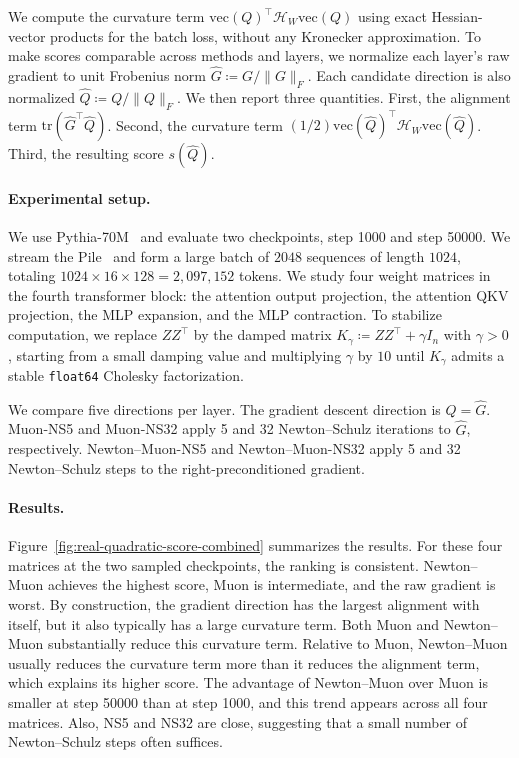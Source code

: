 \documentclass[11pt]{article}
\begin{document}
We compute the curvature term $\mathrm{vec}({Q})^\top {\mathcal{H}}_{{W}} \mathrm{vec}({Q})$ using exact Hessian-vector products for the batch loss, without any Kronecker approximation.
To make scores comparable across methods and layers, we normalize each layer's raw gradient to unit Frobenius norm
$\widehat{{G}} \coloneqq {G} / \|{G}\|_F$.
Each candidate direction is also normalized
$\widehat{{Q}} \coloneqq {Q} / \|{Q}\|_F$.
We then report three quantities. First, the alignment term
$\mathrm{tr}(\widehat{{G}}^\top \widehat{{Q}})$.
Second, the curvature term
$(1/2)\mathrm{vec}(\widehat{{Q}})^\top {\mathcal{H}}_{{W}} \mathrm{vec}(\widehat{{Q}})$.
Third, the resulting score
$s(\widehat{{Q}})$.


\paragraph{Experimental setup.}
We use Pythia-70M~\citep{biderman2023pythia} and evaluate two checkpoints, step 1000 and step 50000. We stream the Pile~\citep{gao2020pile} and form a large batch of $2048$ sequences of length $1024$, totaling $1024 \times 16 \times 128 = 2{,}097{,}152$ tokens. We study four weight matrices in the fourth transformer block: the attention output projection, the attention QKV projection, the MLP expansion, and the MLP contraction. To stabilize computation, we replace ${Z}{Z}^\top$ by the damped matrix ${K}_\gamma \coloneqq {Z}{Z}^\top + \gamma {I}_n$ with $\gamma > 0$, starting from a small damping value and multiplying $\gamma$ by $10$ until ${K}_\gamma$ admits a stable \texttt{float64} Cholesky factorization.

We compare five directions per layer. The gradient descent direction is ${Q} = \widehat{{G}}$. Muon-NS5 and Muon-NS32 apply 5 and 32 Newton--Schulz iterations to $\widehat{{G}}$, respectively. Newton--Muon-NS5 and Newton--Muon-NS32 apply 5 and 32 Newton--Schulz steps to the right-preconditioned gradient.

\paragraph{Results.}
\label{subsec:real-results}

Figure~\ref{fig:real-quadratic-score-combined} summarizes the results. For these four matrices at the two sampled checkpoints, the ranking is consistent. Newton--Muon achieves the highest score, Muon is intermediate, and the raw gradient is worst. By construction, the gradient direction has the largest alignment with itself, but it also typically has a large curvature term. Both Muon and Newton--Muon substantially reduce this curvature term. Relative to Muon, Newton--Muon usually reduces the curvature term more than it reduces the alignment term, which explains its higher score. The advantage of Newton--Muon over Muon is smaller at step 50000 than at step 1000, and this trend appears across all four matrices. Also, NS5 and NS32 are close, suggesting that a small number of Newton--Schulz steps often suffices.
\end{document}
